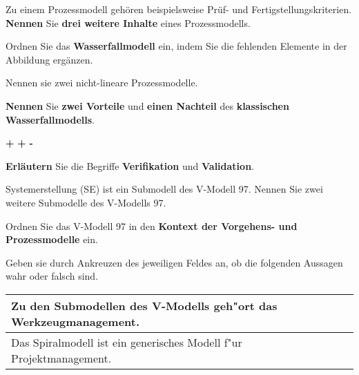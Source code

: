 \documentclass[12pt]{exam}
\begin{document}
\begin{questions}
\question[3] Zu einem Prozessmodell gehören beispielsweise Prüf- und Fertigstellungskriterien. \textbf{Nennen} Sie \textbf{drei weitere Inhalte} eines Prozessmodells.
\addpoints

\question[2] Ordnen Sie das \textbf{Wasserfallmodell} ein, indem Sie die fehlenden Elemente in der Abbildung ergänzen. \\
\addpoints
{}

\question[2] Nennen sie zwei nicht-lineare Prozessmodelle.
\addpoints

\question[3] \textbf{Nennen} Sie \textbf{zwei Vorteile} und \textbf{einen Nachteil} des \textbf{klassischen Wasserfallmodells}.
\addpoints
{
\checkboxchar{ }
\begin{checkboxes}
    \choice \textbf{+}
    \choice \textbf{+}
    \choice \textbf{-}
\end{checkboxes}
}

\question[4] \textbf{Erläutern} Sie die Begriffe \textbf{Verifikation} und \textbf{Validation}.
\addpoints

\question[2] Systemerstellung (SE)  ist ein Submodell des V-Modell 97. Nennen Sie zwei weitere Submodelle des V-Modells 97.
\addpoints

\question[2] Ordnen Sie das V-Modell 97 in den \textbf{Kontext der Vorgehens- und Prozessmodelle} ein.
\addpoints

\question[2] Geben sie durch Ankreuzen des jeweiligen Feldes an, ob die folgenden Aussagen wahr oder falsch sind.
\addpoints
\begin{tabular}{| p{12cm} | c | c |}
    Zu den Submodellen des V-Modells geh"ort das Werkzeugmanagement. & & \\ \hline
    Das Spiralmodell ist ein generisches Modell f"ur Projektmanagement. & & \\ \hline
\end{tabular}


\end{questions}
\end{document}
